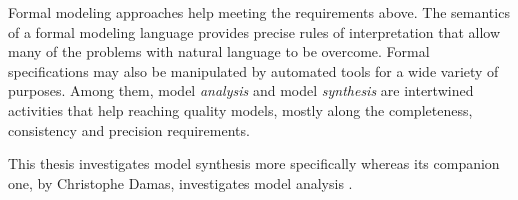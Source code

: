 Formal modeling approaches help meeting the requirements above. The semantics of a formal modeling language provides precise rules of interpretation that allow many of the problems with natural language to be overcome. Formal specifications may also be manipulated by automated tools for a wide variety of purposes. Among them, model \emph{analysis} and model \emph{synthesis} are intertwined activities that help reaching quality models, mostly along the completeness, consistency and precision requirements.

This thesis investigates model synthesis more specifically whereas its companion one, by Christophe Damas, investigates model analysis \cite{Damas:2011}.


